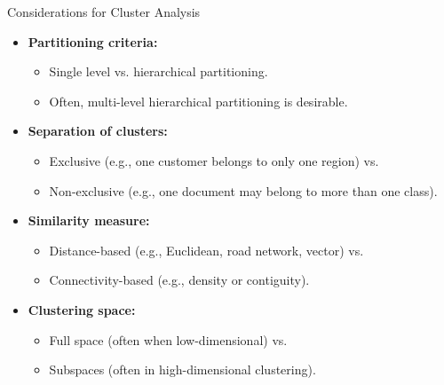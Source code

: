 \begin{frame}{Considerations for Cluster Analysis}
	\begin{itemize}
		\item \textbf{Partitioning criteria:}
		\begin{itemize}
			\item Single level vs. hierarchical partitioning.
			\item Often, multi-level hierarchical partitioning is desirable.
		\end{itemize}
		\item \textbf{Separation of clusters:}
		\begin{itemize}
			\item Exclusive (e.g., one customer belongs to only one region) vs.
			\item Non-exclusive (e.g., one document may belong to more than one 
			class).
		\end{itemize}
		\item \textbf{Similarity measure:}
		\begin{itemize}
			\item Distance-based (e.g., Euclidean, road network, vector) vs.
			\item Connectivity-based (e.g., density or contiguity).
		\end{itemize}
		\item \textbf{Clustering space:}
		\begin{itemize}
			\item Full space (often when low-dimensional) vs.
			\item Subspaces (often in high-dimensional clustering).
		\end{itemize}
	\end{itemize}
\end{frame}

